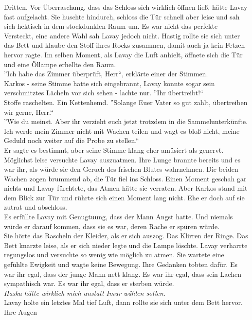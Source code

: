 Dritten. Vor Überraschung, dass das Schloss sich wirklich öffnen ließ, hätte Lavay fast aufgelacht. 
Sie huschte hindurch, schloss die Tür schnell aber leise und sah sich hektisch in dem stockdunklen 
Raum um. Es war nicht das perfekte Versteckt, eine andere Wahl sah Lavay jedoch nicht. Hastig 
rollte sie sich unter das Bett und klaube den Stoff ihres Rocks zusammen, damit auch ja kein Fetzen 
hervor ragte. Im selben Moment, als Lavay die Luft anhielt, öffnete sich die Tür und eine Öllampe 
erhellte den Raum.\\
''Ich habe das Zimmer überprüft, Herr``, erklärte einer der Stimmen.\\
Karkos - seine Stimme hatte sich eingebrannt, Lavay konnte sogar sein verschmitztes Lächeln vor 
sich sehen - lachte nur. ''Ihr übertreibt!``\\
Stoffe raschelten. Ein Kettenhemd. ''Solange Euer Vater so gut zahlt, übertreiben wir gerne, 
Herr.``\\
''Wie du meinst. Aber ihr verzieht euch jetzt trotzdem in die Sammelunterkünfte. Ich werde mein 
Zimmer nicht mit Wachen teilen und wagt es bloß nicht, meine Geduld noch weiter auf die Probe zu 
stellen.``\\
Er sagte es bestimmt, aber seine Stimme klang eher amüsiert als genervt. Möglichst leise versuchte 
Lavay auszuatmen. Ihre Lunge brannte bereits und es war ihr, als würde sie den Geruch des frischen 
Blutes wahrnehmen. Die beiden Wachen zogen brummend ab, die Tür fiel ins Schloss. Einen Moment 
geschah gar nichts und Lavay fürchtete, das Atmen hätte sie verraten. Aber Karkos stand mit dem 
Blick zur Tür und rührte sich einen Moment lang nicht. Ehe er doch auf sie zutrat und abschloss.\\
Es erfüllte Lavay mit Genugtuung, dass der Mann Angst hatte. Und niemals würde er darauf kommen, 
dass sie es war, deren Rache er spüren würde.\\
Sie hörte das Rascheln der Kleider, als er sich auszog. Das Klirren der Ringe. Das Bett knarzte 
leise, als er sich nieder legte und die Lampe löschte. Lavay verharrte regungslos und versuchte so 
wenig wie möglich zu atmen. Sie wartete eine gefühlte Ewigkeit und wagte keine Bewegung. Ihre 
Gedanken tobten dafür. Es war ihr egal, dass der junge Mann nett klang. Es war ihr egal, dass sein 
Lachen sympathisch war. Es war ihr egal, dass er sterben würde.\\
\textit{Haska hätte wirklich mich anstatt Imur wählen sollen.}\\
Lavay holte ein letztes Mal tief Luft, dann rollte sie sich unter dem Bett hervor. Ihre Augen 
